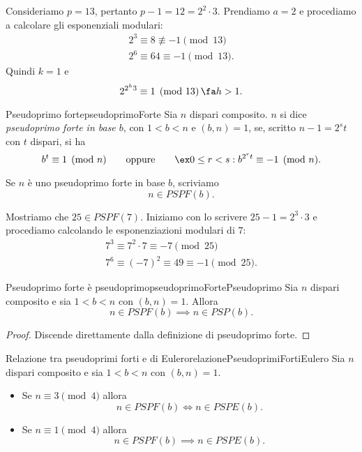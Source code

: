 	\begin{ese}
	Consideriamo \(p=13\), pertanto \(p-1=12 = 2^2\cdot 3\). Prendiamo \(a=2\) e procediamo a calcolare gli esponenziali modulari:
		\begin{gather*}
		2^3 \equiv 8 \not\equiv -1 \pmod{13}\\
		2^6 \equiv 64 \equiv -1 \pmod{13}.
		\end{gather*}
	Quindi \(k=1\) e
		\[
		2^{2^h 3} \equiv 1 \pmod{13}\,\fa h > 1.
		\]
	\end{ese}

	\begin{defn}{Pseudoprimo forte}{pseudoprimoForte}
	Sia \(n\) dispari composito. \(n\) si dice \emph{pseudoprimo forte in base \(b\)}, con \(1<b<n\) e \((b,n)=1\), se, scritto \(n-1=2^s t\) con \(t\) dispari, si ha
		\[
		b^t \equiv 1 \pmod{n} \qquad\text{oppure}\qquad \ex 0 \le r < s: b^{2^r t} \equiv -1 \pmod{n}.
		\]
	\end{defn}

	\begin{notz}
	Se \(n\) è uno pseudoprimo forte in base \(b\), scriviamo
		\[
		n \in PSPF(b).
		\]
	\end{notz}

	\begin{ese}
	Mostriamo che \(25 \in PSPF(7)\).
	Iniziamo con lo scrivere \(25-1=2^3\cdot 3\) e procediamo calcolando le esponenziazioni modulari di \(7\):
		\begin{gather*}
		7^3 \equiv 7^2 \cdot 7 \equiv -7 \pmod{25}\\
		7^6 \equiv (-7)^2 \equiv 49 \equiv -1 \pmod{25}.
		\end{gather*}
	\end{ese}

	\begin{prop}{Pseudoprimo forte è pseudoprimo}{pseudoprimoFortePseudoprimo}
	Sia \(n\) dispari composito e sia \(1<b<n\) con \((b,n)=1\). Allora
		\[
		n \in PSPF(b) \implies n \in PSP(b).
		\]
	\end{prop}

	\begin{proof}
	Discende direttamente dalla definizione di pseudoprimo forte.
	\end{proof}

	\begin{prop}{Relazione tra pseudoprimi forti e di Eulero}{relazionePseudoprimiFortiEulero}
	Sia \(n\) dispari composito e sia \(1<b<n\) con \((b,n)=1\).
	\begin{itemize}
		\item Se \(n\equiv 3 \pmod{4}\) allora
			\[
			n \in PSPF(b) \iff n \in PSPE(b).
			\]
		\item Se \(n\equiv 1 \pmod{4}\) allora
			\[
			n \in PSPF(b) \implies n \in PSPE(b).
			\]
	\end{itemize}
	\end{prop}

